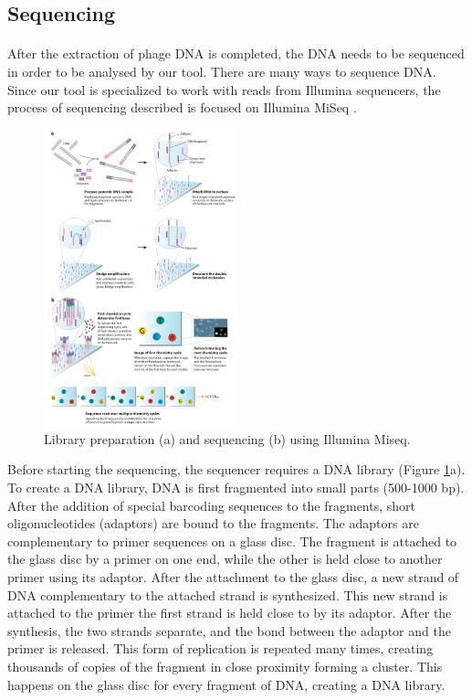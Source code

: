 \subsection{Sequencing}
\paragraph*{}
After the extraction of phage DNA is completed, the DNA needs to be sequenced in order to be analysed by our tool. There are many ways to sequence DNA. Since our tool is specialized to work with reads from Illumina sequencers, the process of sequencing described is focused on Illumina MiSeq \cite{ravi2018miseq}.

\begin{figure}[h]
  \begin{center}
     \includegraphics[width=0.5\textwidth]{images/sequencing.png}
     \caption{Library preparation (a) and sequencing (b) using Illumina Miseq\cite{phdthesis}.}\label{fig:sequencing}
  \end{center}
\end{figure} 

Before starting the sequencing, the sequencer requires a DNA library (Figure \ref{fig:sequencing}a). To create a DNA library, DNA is first fragmented into small parts (500-1000 bp). After the addition of special barcoding sequences to the fragments, short oligonucleotides (adaptors) are bound to the fragments. The adaptors are complementary to primer sequences on a glass disc. The fragment is attached to the glass disc by a primer on one end, while the other is held close to another primer using its adaptor. After the attachment to the glass disc, a new strand of DNA complementary to the attached strand is synthesized. This new strand is attached to the primer the first strand is held close to by its adaptor. After the synthesis, the two strands separate, and the bond between the adaptor and the primer is released. This form of replication is repeated many times, creating thousands of copies of the fragment in close proximity forming a cluster. This happens on the glass disc for every fragment of DNA, creating a DNA library.

